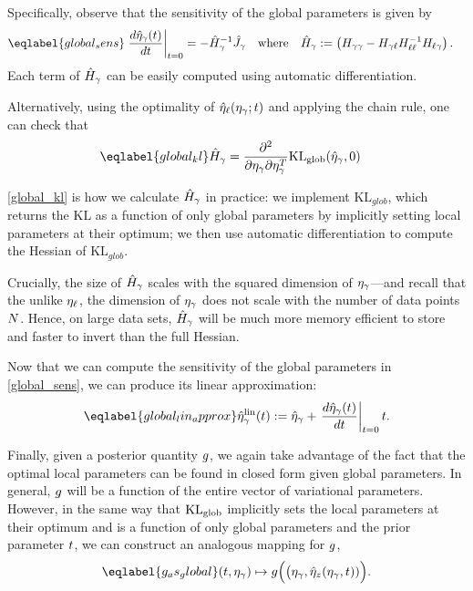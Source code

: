 Specifically, observe that the sensitivity of the global parameters
is given by
\begin{align}\eqlabel{global_sens}
  \fracat{d \etaopt_\gamma(\t)}{d \t}{t = 0} &=
  - \hessopt_\gamma^{-1}\crosshessian_\gamma
  \mathwhere
  \hessopt_\gamma := \left(\hess{\gamma\gamma} -
        \hess{\gamma\ell} \hess{\ell\ell}^{-1} \hess{\ell\gamma}\right).
\end{align}
Each term of $\hat{H}_\gamma$ can be easily computed using automatic differentiation.

Alternatively, using the optimality of $\hat\eta_{\ell}(\eta_\gamma; t)$ and
applying the chain rule, one can check that
\begin{align}\eqlabel{global_kl}
\hessopt_{\gamma} &=
\frac{\partial^2}{\partial\eta_\gamma\partial\eta_\gamma^T}
\KLglobal(\etaopt_\gamma, 0)
\end{align}

\eqref{global_kl} is how we calculate $\hat{H}_\gamma$ in practice:
we implement $\mathrm{KL}_{glob}$, which returns the $\mathrm{KL}$ as a function of only global parameters
by implicitly setting local parameters at their optimum;
we then use automatic differentiation to
compute the Hessian of $\mathrm{KL}_{glob}$.

Crucially, the size of $\hat{H}_\gamma$ scales with the squared dimension
of $\eta_{\gamma}$---and recall that the unlike $\eta_{\ell}$, the dimension of
$\eta_{\gamma}$ does not scale with the number of data points $N$.
Hence, on large data sets, $\hat{H}_\gamma$ will be much more memory efficient
to store and faster to invert than the full Hessian.

Now that we can compute the sensitivity of the global parameters in
\eqref{global_sens}, we can produce its linear approximation:
\begin{align}\eqlabel{global_lin_approx}
  \etalin_\gamma(\t) := \etaopt_\gamma +
  \fracat{d \etaopt_\gamma(\t)}{d \t}{\t=0} \t .
\end{align}

Finally, given a posterior quantity $g$,
we again take advantage of the fact that the optimal
local parameters can be found in closed form given global parameters.
In general, $g$ will be a function of the entire vector of variational parameters.
However, in the same way that $\mathrm{KL}_{\mathrm{glob}}$ implicitly sets the local parameters at their optimum
and is a function of only global parameters and the prior parameter $t$,
we can construct an analogous mapping for $g$,
\begin{align}\eqlabel{g_as_global}
(\t, \etaglob) \mapsto g\Big(\big(\etaglob, \etaoptz(\etaglob, \t))\Big).
\end{align}

